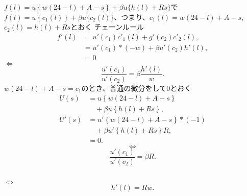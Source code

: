 \begin{frame}[t]{}
\begin{columns}[T]
$f(l)=u\left\{w(24-l)+A-s\right\}+\beta u\{h(l)+Rs\}$で
\pause
$f(l)=u\left\{c_{1}(l)\right\}+\beta u\{c_{2}(l)\}$、つまり、$c_{1}(l)=w(24-l)+A-s$, $c_{2}(l)=h(l)+Rs$とおく
\pause
チェーンルール
\[
\begin{aligned}
f'(l)
&=
u'\left(c_{1}\right)c'_{1}(l)+g'(c_{2})c'_{2}(l),\\
&=
u'\left(c_{1}\right)*(-w)+\beta u'(c_{2})h'(l),\\
&=
0
\end{aligned}
\]
$\Leftrightarrow$
\[
\frac{u'\left(c_{1}\right)}{u'\left(c_{2}\right)}=\beta \frac{h'(l)}{w}.
\]
$w(24-l)+A-s=c_{1}$のとき、普通の微分をして0とおく
\[
\begin{aligned}
U(s)
&=
u\left\{w(24-l)+A-s\right\}\\
&\hspace{1em} +\beta u\left\{h(l)+Rs\right\},\\
U'(s)
&=
u'\left\{w(24-l)+A-s\right\}*(-1)\\
&\hspace{1em} +\beta u'\left\{h(l)+Rs\right\}R,\\
&=
0.
\end{aligned}
\]
\[
\Leftrightarrow
\]
\[
\frac{u'\left(c_{1}\right)}{u'\left(c_{2}\right)}
=
\beta R.
\]
\end{columns}
\hspace{7cm} $\Leftrightarrow$
\[
h'(l)=Rw.
\]

\end{frame}
